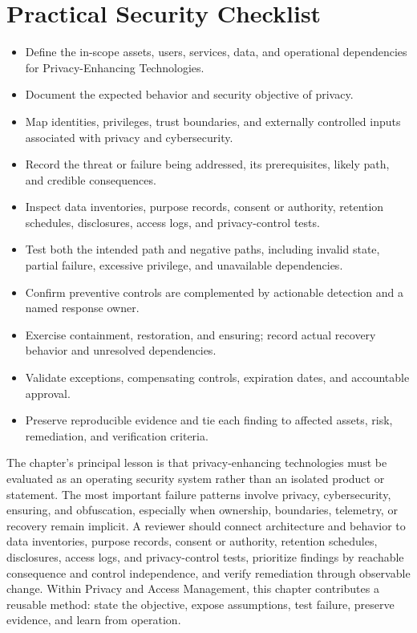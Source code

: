 \documentclass[11pt]{article}
\begin{document}
\section*{Practical Security Checklist}
\begin{itemize}[label=$\square$]
\item Define the in-scope assets, users, services, data, and operational dependencies for Privacy-Enhancing Technologies.
\item Document the expected behavior and security objective of privacy.
\item Map identities, privileges, trust boundaries, and externally controlled inputs associated with privacy and cybersecurity.
\item Record the threat or failure being addressed, its prerequisites, likely path, and credible consequences.
\item Inspect data inventories, purpose records, consent or authority, retention schedules, disclosures, access logs, and privacy-control tests.
\item Test both the intended path and negative paths, including invalid state, partial failure, excessive privilege, and unavailable dependencies.
\item Confirm preventive controls are complemented by actionable detection and a named response owner.
\item Exercise containment, restoration, and ensuring; record actual recovery behavior and unresolved dependencies.
\item Validate exceptions, compensating controls, expiration dates, and accountable approval.
\item Preserve reproducible evidence and tie each finding to affected assets, risk, remediation, and verification criteria.
\end{itemize}
\begin{synthesisbox}
The chapter's principal lesson is that privacy-enhancing technologies must be evaluated as an operating security system rather than an isolated product or statement. The most important failure patterns involve privacy, cybersecurity, ensuring, and obfuscation, especially when ownership, boundaries, telemetry, or recovery remain implicit. A reviewer should connect architecture and behavior to data inventories, purpose records, consent or authority, retention schedules, disclosures, access logs, and privacy-control tests, prioritize findings by reachable consequence and control independence, and verify remediation through observable change. Within Privacy and Access Management, this chapter contributes a reusable method: state the objective, expose assumptions, test failure, preserve evidence, and learn from operation.
\end{synthesisbox}
\end{document}
